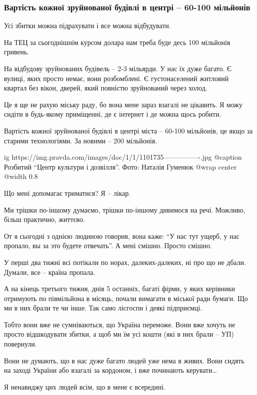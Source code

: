  
 
 
 
 

\subsubsection{Вартість кожної зруйнованої будівлі в центрі – 60-100 мільйонів}
\label{sec:30_03_2022.stz.news.ua.pravda.2.ohtyrka.6.vartist}

Усі збитки можна підрахувати і все можна відбудувати.

На ТЕЦ за сьогоднішнім курсом долара нам треба буде десь 100 мільйонів гривень. 

На відбудову зруйнованих будівель – 2-3 мільярди. У нас їх дуже багато. Є
вулиці, яких просто немає, вони розбомблені. Є густонаселений житловий квартал
без вікон, дверей, який повністю зруйнований через холод.

Це я ще не рахую міську раду, бо вона мене зараз взагалі не цікавить. Я можу
сидіти в будь-якому приміщенні, де є інтернет і де можна щось робити. 

Вартість кожної зруйнованої будівлі в центрі міста – 60-100 мільйонів, це якщо
за старими технологіями. За новими – 200 мільйонів.

\ifcmt
  ig https://img.pravda.com/images/doc/1/1/1101735----------------.jpg
	@caption Розбитий \enquote{Центр культури і дозвілля}. Фото: Наталія Гуменюк
  @wrap center
  @width 0.8
\fi

Що мені допомагає триматися? Я – лікар.

Ми трішки по-іншому думаємо, трішки по-іншому дивимося на речі. Можливо, більш
практично, життєво.

От я сьогодні з однією людиною говорив, вона каже: \enquote{У нас тут ущерб, у нас
пропало, вы за это будете отвечать}. А мені смішно. Просто смішно. 

У перші два тижні всі потікали по норах, далеких-далеких, ні про що не дбали.
Думали, все – країна пропала. 

А на кінець третього тижня, днів 5 останніх, багаті фірми, у яких керівники
отримують по півмільйона в місяць, почали вимагати в міської ради бумаги. Що ми
в них брали те чи інше. Так само лісгоспи і деякі підприємці. 

Тобто вони вже не сумніваються, що Україна переможе. Вони вже хочуть не просто
відшкодувати збитки, а щоб ми їм усі кошти (які в них брали – УП) повернули. 

Вони не думають, що в нас дуже багато людей уже нема в живих. Вони сидять на
заході України або взагалі за кордоном, і вже починають керувати… 

Я ненавиджу цих людей всім, що в мене є всередині.


